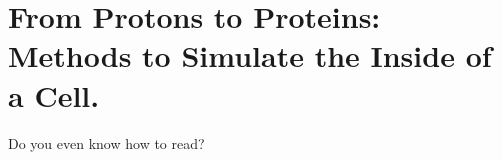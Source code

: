 \chapter{From Protons to Proteins: Methods to Simulate the Inside of a Cell.}

\label{chap:methods}

\begin{chapquote} {Richard P. Feynman}}
	you wanna buy a rock?
\end{chapquote}
Do you even know how to read?

